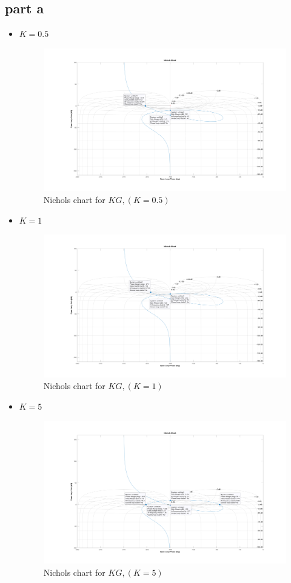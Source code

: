 \subsection{part a}
\begin{itemize}
    \item $K=0.5$
    \begin{figure}[H]
        \caption{Nichols chart for $KG, (K=0.5)$}
        \centering
        \includegraphics[width=16cm]{../Figure/Q1/Q1_a/Q1_aK_0.5.png}
    \end{figure}
    \item $K=1$
    \begin{figure}[H]
        \caption{Nichols chart for $KG, (K=1)$}
        \centering
        \includegraphics[width=16cm]{../Figure/Q1/Q1_a/Q1_aK_1.png}
    \end{figure}
    \item $K=5$
    \begin{figure}[H]
        \caption{Nichols chart for $KG, (K=5)$}
        \centering
        \includegraphics[width=16cm]{../Figure/Q1/Q1_a/Q1_aK_5.png}

\end{figure}
\end{itemize}
